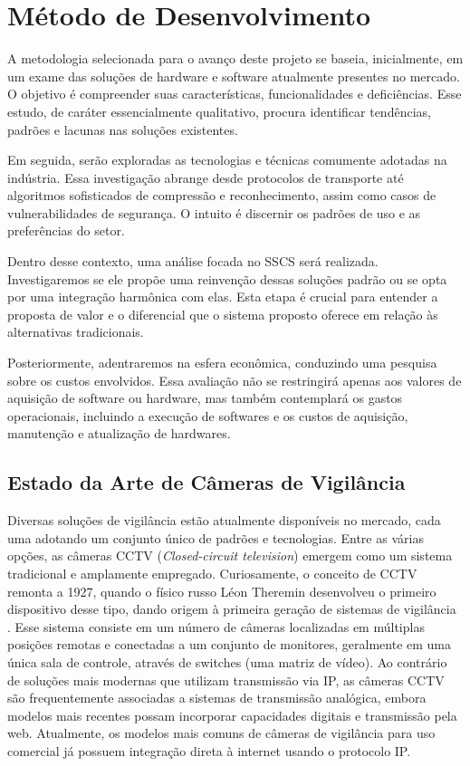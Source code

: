 \documentclass[12pt, %
openright, 
oneside, %
a4paper,    %
brazil]{facom-ufu-abntex2}
\begin{document}
\chapter{Método de Desenvolvimento}

A metodologia selecionada para o avanço deste projeto se baseia, inicialmente,
em um exame das soluções de hardware e software atualmente presentes no
mercado. O objetivo é compreender suas características, funcionalidades e
deficiências. Esse estudo, de caráter essencialmente qualitativo, procura
identificar tendências, padrões e lacunas nas soluções existentes.

Em seguida, serão exploradas as tecnologias e técnicas comumente adotadas na
indústria. Essa investigação abrange desde protocolos de transporte até
algoritmos sofisticados de compressão e reconhecimento, assim como casos de
vulnerabilidades de segurança. O intuito é discernir os padrões de uso e as
preferências do setor.

Dentro desse contexto, uma análise focada no SSCS será realizada.
Investigaremos se ele propõe uma reinvenção dessas soluções padrão ou se opta
por uma integração harmônica com elas. Esta etapa é crucial para entender a
proposta de valor e o diferencial que o sistema proposto oferece em relação às
alternativas tradicionais.

Posteriormente, adentraremos na esfera econômica, conduzindo uma pesquisa sobre
os custos envolvidos. Essa avaliação não se restringirá apenas aos valores de
aquisição de software ou hardware, mas também contemplará os gastos
operacionais, incluindo a execução de softwares e os custos de aquisição,
manutenção e atualização de hardwares.

\section{Estado da Arte de Câmeras de Vigilância}

Diversas soluções de vigilância estão atualmente disponíveis no mercado, cada
uma adotando um conjunto único de padrões e tecnologias. Entre as várias
opções, as câmeras CCTV (\textit{\foreignlanguage{english}{Closed-circuit
		television}}) emergem como um sistema tradicional e amplamente empregado.
Curiosamente, o conceito de CCTV remonta a 1927, quando o físico russo Léon
Theremin desenvolveu o primeiro dispositivo desse tipo, dando origem à primeira
geração de sistemas de vigilância \cite{glinsky2000theremin}. Esse sistema
consiste em um número de câmeras localizadas em múltiplas posições remotas e
conectadas a um conjunto de monitores, geralmente em uma única sala de
controle, através de switches (uma matriz de vídeo). Ao contrário de soluções
mais modernas que utilizam transmissão via IP, as câmeras CCTV são
frequentemente associadas a sistemas de transmissão analógica, embora modelos
mais recentes possam incorporar capacidades digitais e transmissão pela web.
Atualmente, os modelos mais comuns de câmeras de vigilância para uso comercial
já possuem integração direta à internet usando o protocolo IP.
\end{document}
